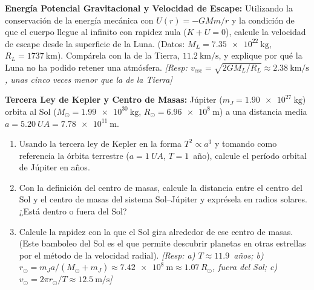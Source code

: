     \item \textbf{Energía Potencial Gravitacional y Velocidad de Escape:}
    Utilizando la conservación de la energía mecánica con
    $U(r) = -GMm/r$ y la condición de que el cuerpo llegue al infinito con
    rapidez nula ($K + U = 0$), calcule la velocidad de escape desde la
    superficie de la Luna. (Datos: $M_L = \SI{7.35e22}{\kilo\gram}$,
    $R_L = \SI{1737}{\kilo\meter}$). Compárela con la de la Tierra,
    $\SI{11.2}{\kilo\meter\per\second}$, y explique por qué la Luna no ha
    podido retener una atmósfera. \textit{[Resp:
    $v_{\text{esc}} = \sqrt{2GM_L/R_L} \approx \SI{2.38}{\kilo\meter\per\second}$,
    unas cinco veces menor que la de la Tierra]}

    \item \textbf{Tercera Ley de Kepler y Centro de Masas:} Júpiter
    ($m_J = \SI{1.90e27}{\kilogram}$) orbita al Sol
    ($M_\odot = \SI{1.99e30}{\kilo\gram}$, $R_\odot = \SI{6.96e8}{\meter}$) a
    una distancia media $a = \SI{5.20}{UA} = \SI{7.78e11}{\meter}$.
    \begin{enumerate}
        \item Usando la tercera ley de Kepler en la forma
        $T^{2} \propto a^{3}$ y tomando como referencia la órbita terrestre
        ($a = \SI{1}{UA}$, $T = 1$~año), calcule el período orbital de
        Júpiter en años.
        \item Con la definición del centro de masas, calcule la distancia
        entre el centro del Sol y el centro de masas del sistema Sol--Júpiter
        y exprésela en radios solares. ¿Está dentro o fuera del Sol?
        \item Calcule la rapidez con la que el Sol gira alrededor de ese
        centro de masas. (Este bamboleo del Sol es el que permite descubrir
        planetas en otras estrellas por el método de la velocidad radial).
        \textit{[Resp: a) $T \approx \num{11.9}$~años; b)
        $r_\odot = m_J a/(M_\odot + m_J) \approx \SI{7.42e8}{\meter} \approx
        1.07\,R_\odot$, fuera del Sol; c) $v_\odot = 2\pi r_\odot/T \approx
        \SI{12.5}{\meter\per\second}$]}
    \end{enumerate}

